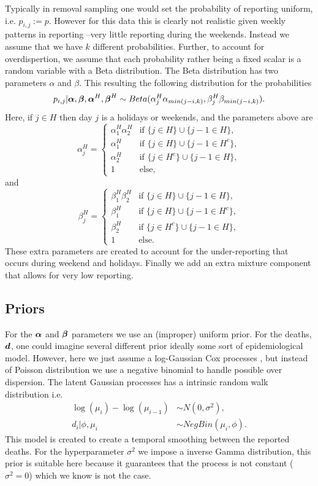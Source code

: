 Typically in removal sampling one would set the probability of reporting uniform, i.e. $p_{i,j}:=p$. However for this data this is clearly not realistic given weekly patterns in reporting --very little reporting during the weekends. Instead we assume that we have $k$ different probabilities. Further, to account for overdispertion, we assume that each probability rather being a fixed scalar is a random variable with a Beta distribution. The Beta distribution has two parameters $\alpha$ and $\beta$. This resulting the following distribution for the probabilities
$$
p_{i,j}| {\boldsymbol{\alpha}},{\boldsymbol{\beta}}, {\boldsymbol{\alpha}}^H,{\boldsymbol{\beta}}^H  \sim Beta(\alpha^H_j\alpha_{min(j-i,k)},\beta^H_j\beta_{min(j-i,k)}).
$$
Here, if $j\in H$ then day $j$ is a holidays or weekends, and the parameters above are
$$
\alpha^H_j = \begin{cases}
\alpha_1^H \alpha_2^H & \mbox{if }  \{j\in H \}\cup  \{j-1\in H \},  \\
\alpha_1^H & \mbox{if }  \{j\in H \}\cup  \{j-1\in H^c \}, \\
\alpha_2^H & \mbox{if }  \{j\in H^c \}\cup  \{j-1\in H \}, \\
1 & \mbox{else,}
\end{cases}
$$
and
$$
\beta^H_j = \begin{cases}
\beta_1^H \beta_2^H & \mbox{if }  \{j\in H \}\cup  \{j-1\in H \},  \\
\beta_1^H & \mbox{if }  \{j\in H \}\cup  \{j-1\in H^c \}, \\
\beta_2^H & \mbox{if }  \{j\in H^c \}\cup  \{j-1\in H \}, \\
1 & \mbox{else.}
\end{cases}
$$
These extra parameters are created to account for the under-reporting that occurs during weekend and holidays.
Finally we add an extra mixture component that allows for very low reporting.

\subsection{Priors}
For the ${\boldsymbol{\alpha}}$ and ${\boldsymbol{\beta}}$ parameters we use an (improper) uniform prior. For the deaths, ${\boldsymbol{d}}$, one could imagine several different prior ideally some sort of epidemiological model. However, here we just assume a log-Gaussian Cox processes \citep{Moller1998_log_gaussian}, but instead of Poisson distribution we use a negative binomial to handle possible over dispersion. The latent Gaussian processes has a intrinsic random walk distribution \citep{Rue2005_gaussian_markov} i.e.
\begin{align*}
\log(\mu_i) - \log(\mu_{i-1}) &\sim N(0,\sigma^2),\\
d_i| \phi, \mu_i  &\sim NegBin(\mu_i, \phi).
\end{align*}
This model is created to create a temporal smoothing between the reported deaths.
For the hyperparameter $\sigma^2$ we impose a inverse Gamma distribution, this prior is suitable here because it guarantees that the process is not constant ($\sigma^2=0$) which we know is not the case.
